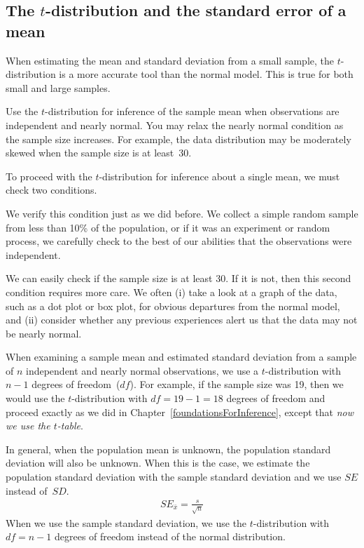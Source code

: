 \subsection{The $t$-distribution and the standard error of a mean}
\label{tDistSolutionToSEProblem}

When estimating the mean and standard deviation from a small sample, the $t$-distribution is a more accurate tool than the normal model. This is true for both small and large samples.

\begin{tipBox}{
Use the $t$-distribution for inference of the sample mean when observations are independent and nearly normal. You may relax the nearly normal condition as the sample size increases. For example, the data distribution may be moderately skewed when the sample size is at least~30.
}
\end{tipBox}


To proceed with the $t$-distribution for inference about a single mean, we must check two conditions.
\begin{description}
\setlength{\itemsep}{0mm}
\item[Independence of observations.] We verify this condition just as we did before. We collect a simple random sample from less than 10\% of the population, or if it was an experiment or random process, we carefully check to the best of our abilities that the observations were independent.
\item[$\mathbf{n\ge 30}$ or observations come from a nearly normal distribution.] We can easily check if the sample size is at least 30. If it is not, then this second condition requires more care. We often (i) take a look at a graph of the data, such as a dot plot or box plot, for obvious departures from the normal model, and (ii) consider whether any previous experiences alert us that the data may not be nearly normal.
\end{description}
When examining a sample mean and estimated standard deviation from a sample of $n$ independent and nearly normal observations, we use a $t$-distribution with $n-1$ degrees of freedom~($df$). For example, if the sample size was 19, then we would use the $t$-distribution with $df=19-1=18$ degrees of freedom and proceed exactly as we did in Chapter~\ref{foundationsForInference}, except that \emph{now we use the $t$-table}.

\begin{termBox}{
In general, when the population mean is unknown, the population standard deviation will also be unknown. When this is the case, we estimate the population standard deviation with the sample standard deviation and we use $SE$ instead of~$SD$.
\begin{align*}
SE_{\bar{x}}=\frac{s}{\sqrt{n}}
\end{align*}
When we use the sample standard deviation, we use the $t$-distribution with $df=n-1$ degrees of freedom instead of the normal distribution.}
\end{termBox}

